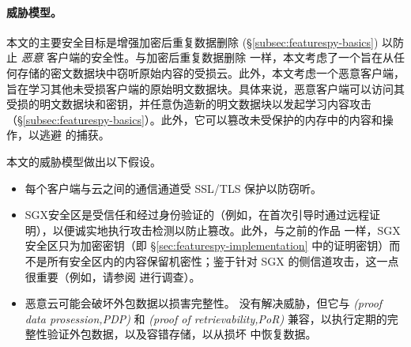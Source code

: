 \paragraph*{威胁模型。} 本文的主要安全目标是增强加密后重复数据删除 (\S\ref{subsec:featurespy-basics}) 以防止 {\em 恶意} 客户端的安全性。与加密后重复数据删除 \cite{bellare2013MLE} 一样，本文考虑了一个旨在从任何存储的密文数据块中窃听原始内容的受损云。此外，本文考虑一个恶意客户端，旨在学习其他未受损客户端的原始明文数据块。具体来说，恶意客户端可以访问其受损的明文数据块和密钥，并任意伪造新的明文数据块以发起学习内容攻击（\S\ref{subsec:featurespy-basics}）。此外，它可以篡改未受保护的内存中的内容和操作，以逃避 \sysnameF 的捕获。

本文的威胁模型做出以下假设。
\begin{itemize}[leftmargin=*]
    \item
          每个客户端与云之间的通信通道受 SSL/TLS 保护以防窃听。
    \item
          SGX安全区是受信任和经过身份验证的（例如，在首次引导时通过远程证明），以便诚实地执行攻击检测以防止篡改。此外，与之前的作品 \cite{shinde20, ren21} 一样，SGX安全区只为加密密钥（即 \S\ref{sec:featurespy-implementation} 中的证明密钥）而不是所有安全区内的内容保留机密性；鉴于针对 SGX 的侧信道攻击，这一点很重要（例如，请参阅 \cite{fei21} 进行调查）。
    \item
          恶意云可能会破坏外包数据以损害完整性。 \sysnameF 没有解决威胁，但它与 \textit{  (proof data prosession,PDP)} \cite{ateniese2007provable} 和 \textit{  (proof of retrievability,PoR)} \cite{juels07} 兼容，以执行定期的完整性验证外包数据，以及容错存储，以从损坏 \cite{li15} 中恢复数据。
\end{itemize}